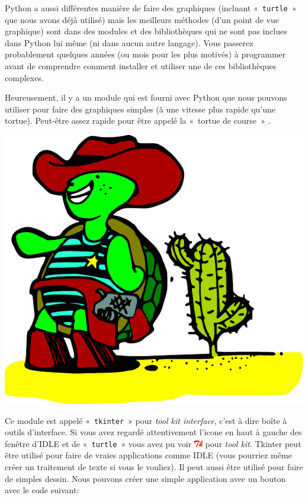 Python a aussi différentes manière de faire des graphiques (incluant «~\texttt{turtle}~»  que nous avons déjà utilisé) mais les meilleurs méthodes (d'un point de vue graphique) sont dans des modules et des bibliothèques qui ne sont pas inclues dans Python lui même (ni dans aucun autre langage).
Vous passerez probablement quelques années (ou mois pour les plus motivés) à programmer avant de comprendre comment installer et utiliser une de ces bibliothèques complexes.

Heureusement, il y a un module qui est fourni avec Python que nous pouvons utiliser pour faire des graphiques simples (à une vitesse plus rapide qu'une tortue). Peut-être assez rapide pour être appelé la «~tortue de course~» .
\begin{center}
\includegraphics[scale=1]{images/tortue_rapide}
\end{center}

Ce module est appelé «~\texttt{tkinter}~» pour \emph{tool kit interface}, c'est à dire boîte à outils d'interface.
Si vous avez regardé  attentivement l'icone en haut à gauche des fenêtre d'IDLE et de «~\texttt{turtle}~» vous avez pu voir \includegraphics[scale=1]{images/tk} pour \emph{tool kit}. Tkinter peut être utilisé pour faire de vraies applications comme IDLE (vous pourriez même créer un traitement de texte si vous le vouliez). Il peut aussi être utilisé pour faire de simples dessin. Nous pouvons créer une simple application avec un bouton avec le code suivant:


